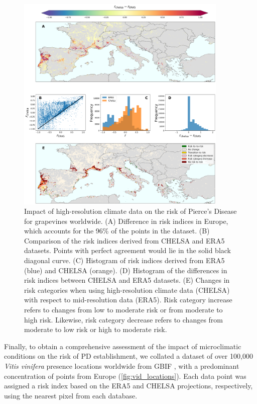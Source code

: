 \begin{figure}[H]
    \centering

    \includegraphics[width=0.9\textwidth]{Figures/risk_difference_vineyards.pdf}
    \caption[Impact of high-resolution climate data on the risk of Pierce's
        Disease for grapevines worldwide]{Impact of high-resolution climate
        data on
        the risk of Pierce's
        Disease for grapevines worldwide. (A) Difference in risk indices in
        Europe,
        which accounts for the 96\% of the points in the dataset. (B)
        Comparison of the
        risk indices derived from CHELSA and ERA5 datasets. Points with perfect
        agreement would lie in the solid black diagonal curve. (C) Histogram of
        risk
        indices derived from ERA5 (blue) and CHELSA (orange). (D) Histogram of
        the
        differences in risk indices between CHELSA and ERA5 datasets. (E)
        Changes in
        risk categories when using high-resolution climate data (CHELSA) with
        respect
        to mid-resolution data (ERA5). Risk category increase refers to changes
        from
        low to moderate risk or from moderate to high risk. Likewise, risk
        category
        decrease refers to changes from moderate to low risk or high to
        moderate risk.}
    \label{fig:risk_dif_vid}
\end{figure}

Finally, to obtain a comprehensive assessment of the impact of
microclimatic conditions on the risk of PD establishment, we collated a dataset
of over 100,000 \textit {Vitis vinifera} presence locations worldwide from GBIF
\cite{GBIF}, with a predominant concentration of points from Europe
(\cref{fig:vid_locations}). Each data point was assigned a risk index
based on
the ERA5 and CHELSA projections, respectively, using the nearest pixel from
each database.

